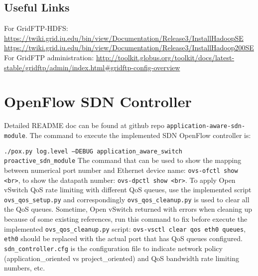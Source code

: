 \documentclass[a4paper]{article}
\begin{document}
\subsection{Useful Links}
For GridFTP-HDFS:\newline
\url{https://twiki.grid.iu.edu/bin/view/Documentation/Release3/InstallHadoopSE}\newline
\url{https://twiki.grid.iu.edu/bin/view/Documentation/Release3/InstallHadoop200SE}\newline \newline
For GridFTP administration:\newline
\url{http://toolkit.globus.org/toolkit/docs/latest-stable/gridftp/admin/index.html#gridftp-config-overview}
\section{OpenFlow SDN Controller}
Detailed README doc can be found at github repo {\tt application-aware-sdn-module}. The command to execute the implemented SDN OpenFlow controller is: 

{\tt ./pox.py log.level --DEBUG application\_aware\_switch proactive\_sdn\_module}\newline
The command that can be used to show the mapping between numerical port number and Ethernet device name: {\tt ovs-ofctl show <br>}, to show the datapath number: {\tt ovs-dpctl show <br>}.\newline \newline 
To apply Open vSwitch QoS rate limiting with different QoS queues, use the implemented script {\tt ovs\_qos\_setup.py} and correspondingly {\tt ovs\_qos\_cleanup.py} is used to clear all the QoS queues. Sometime, Open vSwitch returned with errors when cleaning up because of some existing references, run this command to fix before execute the implemented {\tt ovs\_qos\_cleanup.py} script: {\tt ovs-vsctl clear qos eth0 queues}, {\tt eth0} should be replaced with the actual port that has QoS queues configured.\newline \newline
{\tt sdn\_controller.cfg} is the configuration file to indicate network policy (application\_oriented vs project\_oriented) and QoS bandwidth rate limiting numbers, etc.
\end{document}
